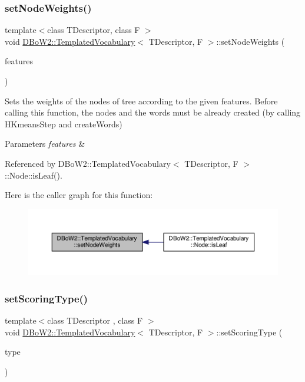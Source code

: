 \subsubsection{\texorpdfstring{set\+Node\+Weights()}{setNodeWeights()}}
{\footnotesize\ttfamily template$<$class T\+Descriptor, class F $>$ \\
void \hyperlink{classDBoW2_1_1TemplatedVocabulary}{D\+Bo\+W2\+::\+Templated\+Vocabulary}$<$ T\+Descriptor, F $>$\+::set\+Node\+Weights (\begin{DoxyParamCaption}\item[{const std\+::vector$<$ std\+::vector$<$ T\+Descriptor $>$ $>$ \&}]{features }\end{DoxyParamCaption})\hspace{0.3cm}{\ttfamily [protected]}}

Sets the weights of the nodes of tree according to the given features. Before calling this function, the nodes and the words must be already created (by calling H\+Kmeans\+Step and create\+Words) 
\begin{DoxyParams}{Parameters}
{\em features} & \\
\hline
\end{DoxyParams}


Referenced by D\+Bo\+W2\+::\+Templated\+Vocabulary$<$ T\+Descriptor, F $>$\+::\+Node\+::is\+Leaf().

Here is the caller graph for this function\+:\nopagebreak
\begin{figure}[H]
\begin{center}
\leavevmode
\includegraphics[width=350pt]{classDBoW2_1_1TemplatedVocabulary_a1a0a9cf4052090c041ff9442be7b22f6_icgraph}
\end{center}
\end{figure}
\mbox{\label{classDBoW2_1_1TemplatedVocabulary_a05a6c2f46184618c9ea8368f53e6980c}} 
\subsubsection{\texorpdfstring{set\+Scoring\+Type()}{setScoringType()}}
{\footnotesize\ttfamily template$<$class T\+Descriptor , class F $>$ \\
void \hyperlink{classDBoW2_1_1TemplatedVocabulary}{D\+Bo\+W2\+::\+Templated\+Vocabulary}$<$ T\+Descriptor, F $>$\+::set\+Scoring\+Type (\begin{DoxyParamCaption}\item[{\hyperlink{namespaceDBoW2_aa252a592dd607c6e60dede06ceef2722}{Scoring\+Type}}]{type }\end{DoxyParamCaption})}

